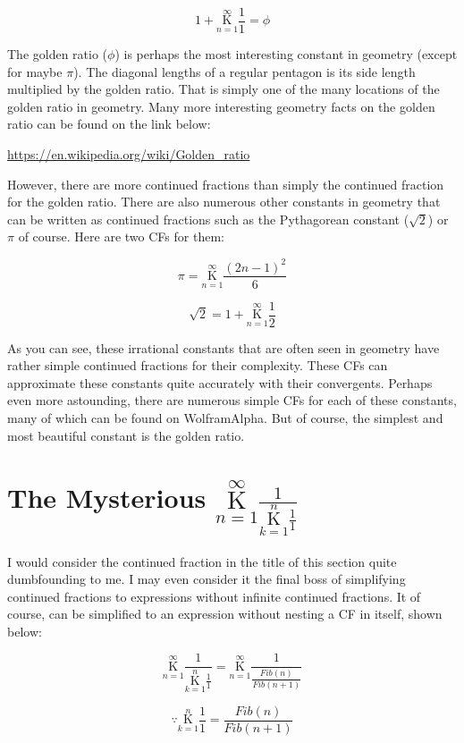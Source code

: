 \documentclass{article}
\begin{document}
$$1+\underset{n=1}{\overset{\infty}{\mathrm K}} \frac{1}{1} = \phi$$

The golden ratio ($\phi$) is perhaps the most interesting constant in geometry (except for maybe $\pi$). The diagonal lengths of a regular pentagon is its side length multiplied by the golden ratio. That is simply one of the many locations of the golden ratio in geometry. Many more interesting geometry facts on the golden ratio can be found on the link below:

$${}$$
\url{https://en.wikipedia.org/wiki/Golden_ratio}
$${}$$

However, there are more continued fractions than simply the continued fraction for the golden ratio. There are also numerous other constants in geometry that can be written as continued fractions such as the Pythagorean constant ($\sqrt{2}$) or $\pi$ of course. Here are two CFs for them:

$$ \pi = \underset{n=1}{\overset{\infty}{ \mathrm K}} \frac{(2n-1)^2}{6} $$

$$\sqrt{2}=1+\underset{n=1}{\overset{\infty}{ \mathrm K}} \frac{1}{2}$$

As you can see, these irrational constants that are often seen in geometry have rather simple continued fractions for their complexity. These CFs can approximate these constants quite accurately with their convergents. Perhaps even more astounding, there are numerous simple CFs for each of these constants, many of which can be found on WolframAlpha. But of course, the simplest and most beautiful constant is the golden ratio.

\section{The Mysterious $\underset{n=1}{\overset{\infty}{ \mathrm K}} \frac{1}{ \underset{k=1}{\overset{n}{ \mathrm K}} \frac{1}{1} } $}

I would consider the continued fraction in the title of this section quite dumbfounding to me. I may even consider it the final boss of simplifying continued fractions to expressions without infinite continued fractions. It of course, can be simplified to an expression without nesting a CF in itself, shown below:

$$\underset{n=1}{\overset{\infty}{ \mathrm K}} \frac{1}{ \underset{k=1}{\overset{n}{ \mathrm K}} \frac{1}{1} } = \underset{n=1}{\overset{\infty}{ \mathrm K}} \frac{1}{ \frac{Fib(n)}{Fib(n+1)} }$$

$$\because \underset{k=1}{\overset{n}{ \mathrm K}} \frac{1}{1} = \frac{Fib(n)}{Fib(n+1)}$$
\end{document}
